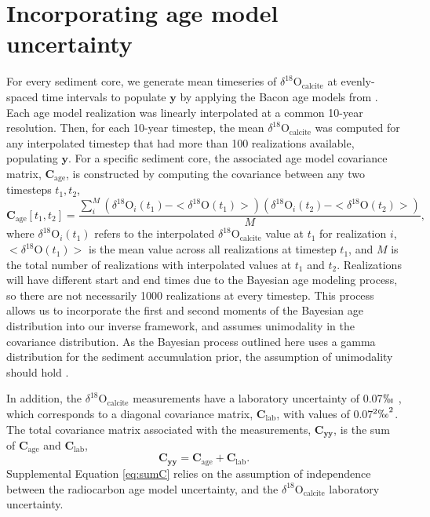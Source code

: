 \documentclass[draft]{agujournal2019}
\begin{document}
\section{Incorporating age model uncertainty \label{sec:agemodel}}
For every sediment core, we generate mean timeseries of $\delta^{18}\mathrm{O}_{\mathrm{calcite}}$ at evenly-spaced time intervals to populate $\mathbf{y}$ by applying the Bacon age models \cite[]{Bacon, McKay-Emile-Geay-2021:R} from . Each age model realization was linearly interpolated at a common 10-year resolution. Then, for each 10-year timestep, the mean $\delta^{18}\mathrm{O}_{\mathrm{calcite}}$ was computed for any interpolated timestep that had more than 100 realizations available, populating $\mathbf{y}$. For a specific sediment core, the associated age model covariance matrix, $\mathbf{C_{\mathrm{age}}}$, is constructed by computing the covariance between any two timesteps $t_{1}, t_{2}$,
\begin{equation}
\label{eq:covariance}
  \mathbf{C_{\mathrm{age}}}[t_1, t_2] = \frac{\sum_i^M \left(\delta^{18}\mathrm{O}_i(t_1) - <\delta^{18}\mathrm{O}(t_1)>
    \right) \left( \delta^{18}\mathrm{O}_i(t_2) - <\delta^{18}\mathrm{O}(t_2)> \right) }{M}, 
\end{equation}
where $\delta^{18}\mathrm{O}_{i}(t_1)$ refers to the interpolated $\delta^{18}\mathrm{O}_{\mathrm{calcite}}$ value at $t_{1}$ for realization $i$, $<\delta^{18}\mathrm{O}(t_1)>$ is the mean value across all realizations at timestep $t_1$, and $M$ is the total number of realizations with interpolated values at $t_{1}$ and $t_{2}$. Realizations will have different start and end times due to the Bayesian age modeling process, so there are not necessarily 1000 realizations at every timestep. This process allows us to incorporate the first and second moments of the Bayesian age distribution into our inverse framework, and assumes unimodality in the covariance distribution. As the Bayesian process outlined here uses a gamma distribution for the sediment accumulation prior, the assumption of unimodality should hold \cite[]{Bacon}. 

In addition, the $\delta^{18}\mathrm{O}_{\mathrm{calcite}}$ measurements have a laboratory uncertainty of 0.07$\permil$ \cite{Lu-Oppo-2023:Surface}, which corresponds to a diagonal covariance matrix, $\mathbf{C_{\mathrm{lab}}}$, with values of 0.07$^{2}\permil^{2}$. The total covariance matrix associated with the measurements, $\mathbf{C_{yy}}$, is the sum of $\mathbf{C_{\mathrm{age}}}$ and $\mathbf{C_{\mathrm{lab}}}$,
\begin{equation}
\label{eq:sumC}
\mathbf{C_{yy}} = \mathbf{C_{\mathrm{age}}} + \mathbf{C_{\mathrm{lab}}}. 
\end{equation}
Supplemental Equation \ref{eq:sumC} relies on the assumption of independence between the radiocarbon age model uncertainty, and the $\delta^{18}\mathrm{O}_{\mathrm{calcite}}$ laboratory uncertainty. %
\end{document}
